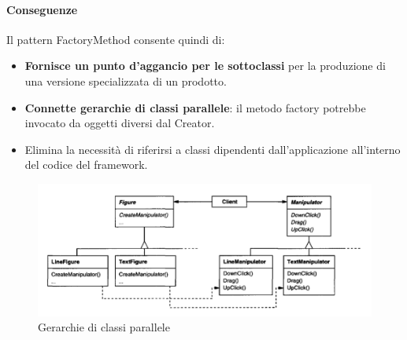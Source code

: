 \paragraph{Conseguenze} Il pattern FactoryMethod consente quindi di:
\begin{itemize}
    \item \textbf{Fornisce un punto d’aggancio per le sottoclassi} per la produzione di una versione specializzata di un prodotto.
    \item \textbf{Connette gerarchie di classi parallele}: il metodo factory potrebbe invocato da oggetti diversi dal Creator.
    \item Elimina la necessità di riferirsi a classi dipendenti dall’applicazione all’interno del codice del framework.
\end{itemize}

\begin{figure}[H]
    \centering
    \includegraphics[width=0.75\linewidth]{assets/pattern/factory-method/factory-method-parallelo.png}
    \caption{Gerarchie di classi parallele}
\end{figure}

\newpage